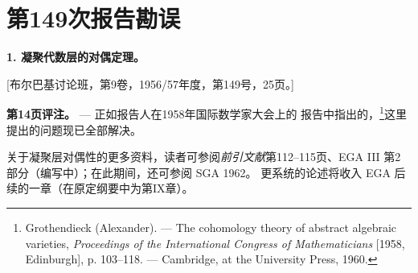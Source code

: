 \clearpage
\chapter*{第149次报告勘误}
\setcounter{footnote}{0}

\noindent\textbf{1. 凝聚代数层的对偶定理。}

\begin{center}
[布尔巴基讨论班，第9卷，1956/57年度，第149号，25页。]
\end{center}

\noindent\textbf{第14页评注。} --- 正如报告人在1958年国际数学家大会上的
报告中指出的，\footnote{Grothendieck (Alexander). --- The cohomology
theory of abstract algebraic varieties, \emph{Proceedings of the
International Congress of Mathematicians} [1958, Edinburgh], p. 103--118.
--- Cambridge, at the University Press, 1960.}这里提出的问题现已全部解决。

关于凝聚层对偶性的更多资料，读者可参阅\emph{前引文献}\footnotemark[1]
第112--115页、EGA III 第2部分（编写中）；在此期间，还可参阅 SGA 1962。
更系统的论述将收入 EGA 后续的一章（在原定纲要中为第IX章）。

\par

